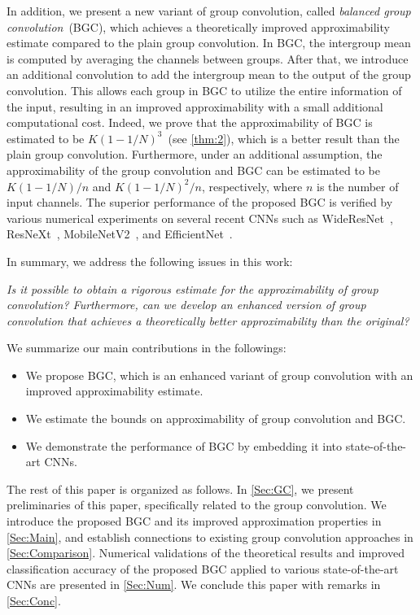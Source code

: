 \documentclass[preprint,12pt,authoryear]{elsarticle}
\numberwithin{equation}{section}
\theoremstyle{remark}
\begin{document}
In addition, we present a new variant of group convolution, called \textit{balanced group convolution}~(BGC), which achieves a theoretically improved approximability estimate compared to the plain group convolution.
In BGC, the intergroup mean is computed by averaging the channels between groups.
After that, we introduce an additional convolution to add the intergroup mean to the output of the group convolution.
This allows each group in BGC to utilize the entire information of the input, resulting in an improved approximability with a small additional computational cost.
Indeed, we prove that the approximability of BGC is estimated to be $K(1-1/N)^{3}$~(see \cref{thm:2}), which is a better result than the plain group convolution.
Furthermore, under an additional assumption, the approximability of the group convolution and BGC can be estimated to be $K(1-1/N)/n$ and $K(1-1/N)^{2}/n$, respectively, where $n$ is the number of input channels.
The superior performance of the proposed BGC is verified by various numerical experiments on several recent CNNs such as WideResNet~\citep{zagoruyko2016wide}, ResNeXt~\citep{xie2017aggregated}, MobileNetV2~\citep{sandler2018mobilenetv2}, and EfficientNet~\citep{tan2019efficientnet}.

In summary, we address the following issues in this work:
\begin{displayquote}
    \textit{Is it possible to obtain a rigorous estimate for the approximability of group convolution? Furthermore, can we develop an enhanced version of group convolution that achieves a theoretically better approximability than the original?}
\end{displayquote}

We summarize our main contributions in the followings:
\begin{itemize}
    \item We propose BGC, which is an enhanced variant of group convolution with an improved approximability estimate.
    \item We estimate the bounds on approximability of group convolution and BGC.
    \item We demonstrate the performance of BGC by embedding it into state-of-the-art CNNs.
\end{itemize}

The rest of this paper is organized as follows.
In \cref{Sec:GC}, we present preliminaries of this paper, specifically related to the group convolution.
We introduce the proposed BGC and its improved approximation properties in \cref{Sec:Main}, and establish connections to existing group convolution approaches in \cref{Sec:Comparison}.
Numerical validations of the theoretical results and improved classification accuracy of the proposed BGC applied to various state-of-the-art CNNs are presented in \cref{Sec:Num}.
We conclude this paper with remarks in \cref{Sec:Conc}.
\end{document}
